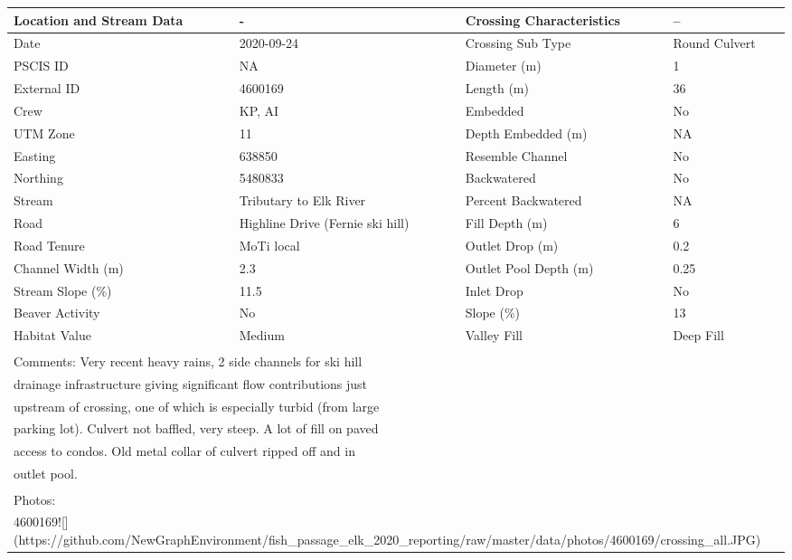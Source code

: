 \documentclass[
]{book}
\begin{document}
\begin{tabular}{l|l|l|l}
\hline
Location and Stream Data & - & Crossing Characteristics & --\\
\hline
Date & 2020-09-24 & Crossing Sub Type & Round Culvert\\
\hline
PSCIS ID & NA & Diameter (m) & 1\\
\hline
External ID & 4600169 & Length (m) & 36\\
\hline
Crew & KP, AI & Embedded & No\\
\hline
UTM Zone & 11 & Depth Embedded (m) & NA\\
\hline
Easting & 638850 & Resemble Channel & No\\
\hline
Northing & 5480833 & Backwatered & No\\
\hline
Stream & Tributary to Elk River & Percent Backwatered & NA\\
\hline
Road & Highline Drive (Fernie ski hill) & Fill Depth (m) & 6\\
\hline
Road Tenure & MoTi local & Outlet Drop (m) & 0.2\\
\hline
Channel Width (m) & 2.3 & Outlet Pool Depth (m) & 0.25\\
\hline
Stream Slope (\%) & 11.5 & Inlet Drop & No\\
\hline
Beaver Activity & No & Slope (\%) & 13\\
\hline
Habitat Value & Medium & Valley Fill & Deep Fill\\
\hline
\multicolumn{4}{l}{\textsuperscript{} Comments: Very recent heavy rains, 2 side channels for ski hill}\\
\multicolumn{4}{l}{drainage infrastructure giving significant flow contributions just}\\
\multicolumn{4}{l}{upstream of crossing, one of which is especially turbid (from large}\\
\multicolumn{4}{l}{parking lot). Culvert not baffled, very steep. A lot of fill on paved}\\
\multicolumn{4}{l}{access to condos. Old metal collar of culvert ripped off and in}\\
\multicolumn{4}{l}{outlet pool.}\\
\multicolumn{4}{l}{\textsuperscript{} Photos:}\\
\multicolumn{4}{l}{4600169![](https://github.com/NewGraphEnvironment/fish\_passage\_elk\_2020\_reporting/raw/master/data/photos/4600169/crossing\_all.JPG)}\\
\end{tabular}
\end{document}
